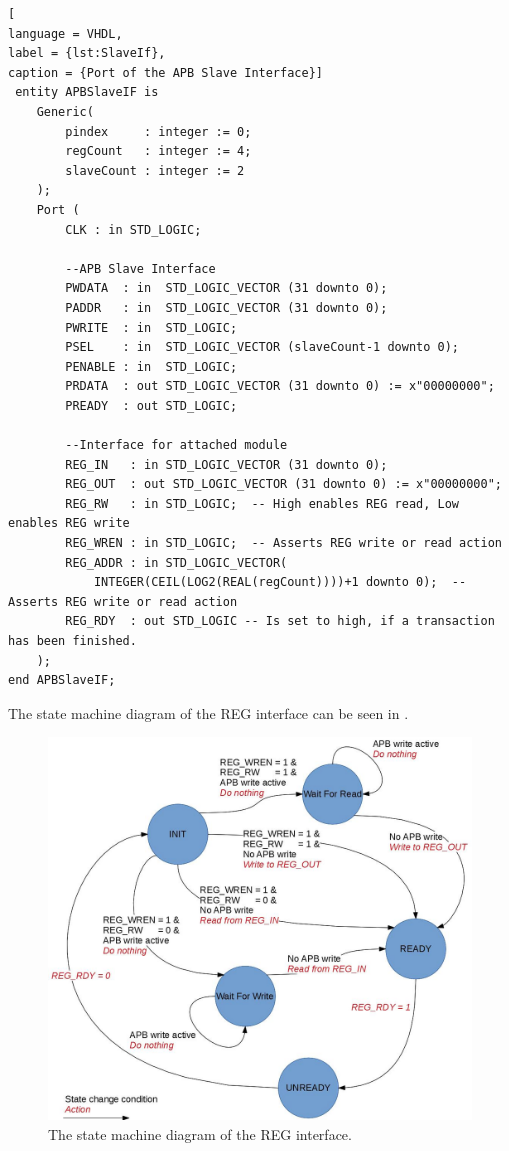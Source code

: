 \documentclass[%
	a4paper,
]
{article}
\begin{document}
\begin{minipage}{\linewidth}
\begin{lstlisting}[
language = VHDL,
label = {lst:SlaveIf},
caption = {Port of the APB Slave Interface}]
 entity APBSlaveIF is
    Generic(
        pindex     : integer := 0;
        regCount   : integer := 4;
        slaveCount : integer := 2
    );
    Port (
        CLK : in STD_LOGIC;
        
        --APB Slave Interface
        PWDATA  : in  STD_LOGIC_VECTOR (31 downto 0);
        PADDR   : in  STD_LOGIC_VECTOR (31 downto 0);
        PWRITE  : in  STD_LOGIC;
        PSEL    : in  STD_LOGIC_VECTOR (slaveCount-1 downto 0);
        PENABLE : in  STD_LOGIC;
        PRDATA  : out STD_LOGIC_VECTOR (31 downto 0) := x"00000000";
        PREADY  : out STD_LOGIC;
        
        --Interface for attached module
        REG_IN   : in STD_LOGIC_VECTOR (31 downto 0);
        REG_OUT  : out STD_LOGIC_VECTOR (31 downto 0) := x"00000000";
        REG_RW   : in STD_LOGIC;  -- High enables REG read, Low enables REG write
        REG_WREN : in STD_LOGIC;  -- Asserts REG write or read action
        REG_ADDR : in STD_LOGIC_VECTOR( 
            INTEGER(CEIL(LOG2(REAL(regCount))))+1 downto 0);  -- Asserts REG write or read action
        REG_RDY  : out STD_LOGIC -- Is set to high, if a transaction has been finished.
    );    
end APBSlaveIF;
\end{lstlisting}
\end{minipage}

The state machine diagram of the REG interface can be seen in .

\begin{figure}[h!]
 \includegraphics[width = \textwidth]{fig/REGStateMachine.jpg}
 \caption{The state machine diagram of the REG interface.}
 \label{fig:RegStateMachine}
\end{figure}
\end{document}
